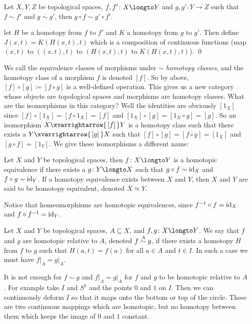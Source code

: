 \bprop

    Let $X,Y,Z$ be topological spaces, $f,f'\colon X\longto Y$ and $g,g'\colon Y\to Z$ such that $f\sim f'$ and $g\sim g'$, then $g\circ f\sim g'\circ f'$.

\eprop

\Proof let $H$ be a homotopy from $f$ to $f'$ and $K$ a homotopy from $g$ to $g'$.
Then define $J(x,t)=K(H(x,t),t)$ which is a composition of continuous functions (map $(x,t)$ to $((x,t),t)$ to $(H(x,t),t)$ to $K(H(x,t),t)$).
\qed

We call the equivalence classes of morphisms under $\sim$ {\it homotopy classes}, and the homotopy class of a morphism $f$ is denoted $[f]$.
So by above, $[f]\circ[g]\coloneqq[f\circ g]$ is a well-defined operation.
This gives us a new category whose objects are topological spaces and morphisms are homotopy classes.
What are the isomorphisms in this category?
Well the identities are obviously $[1_X]$ since $[f]\circ[1_X]=[f\circ1_X]=[f]$ and $[1_X]\circ[g]=[1_X\circ g]=[g]$.
So an isomorphism $X\xvarrightarrow{\,[f]\,}Y$ is a homotopy class such that there exists a $Y\xvarrightarrow{\,[g]\,}X$ such that $[f]\circ[g]=[f\circ g]=[1_X]$ and $[g\circ f]=[1_Y]$.
We give these isomorphisms a different name:

\bdefn

    Let $X$ and $Y$ be topological spaces, then $f\colon X\longto Y$ is a {\emphcolor homotopic equivalence} if there exists a $g\colon Y\longto X$ such that $g\circ f\sim{\rm id}_X$ and
    $f\circ g\sim{\rm id}_Y$.
    If a homotopy equivalence exists between $X$ and $Y$, then $X$ and $Y$ are said to be {\emphcolor homotopy equivalent}, denoted $X\simeq Y$.

\edefn

Notice that homeomorphisms are homotopic equivalences, since $f^{-1}\circ f={\rm id}_X$ and $f\circ f^{-1}={\rm id}_Y$.

\bdefn

    Let $X$ and $Y$ be topological spaces, $A\subseteq X$, and $f,g\colon X\longto Y$.
    We say that $f$ and $g$ are homotopic relative to $A$, denoted $f\buildrel A\over\sim g$, if there exists a homotopy $H$ from $f$ to $g$ such that $H(a,t)=f(a)$ for all $a\in A$ and $t\in I$.
    In such a case we must have $f\bigr|_A=g\bigr|_A$.

\edefn

It is not enough for $f\sim g$ and $f\bigr|_A=g\bigr|_A$ for $f$ and $g$ to be homotopic relative to $A$.
For example take $I$ and $S^1$ and the points $0$ and $1$ on $I$.
Then we can continuously deform $I$ so that it maps onto the bottom or top of the circle.
These are two continuous mappings which are homotopic, but no homotopy between them which keeps the image of $0$ and $1$ constant.

